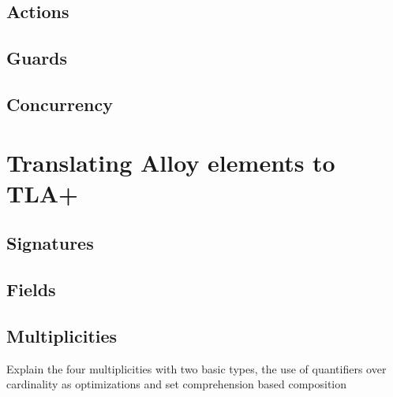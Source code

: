 \subsection{Actions}

\subsection{Guards}

\subsection{Concurrency}

\section{Translating Alloy elements to TLA+}

\subsection{Signatures}


\subsection{Fields}

\subsection{Multiplicities}

Explain the four multiplicities with two basic types, the use of quantifiers over cardinality as optimizations and set comprehension based composition


